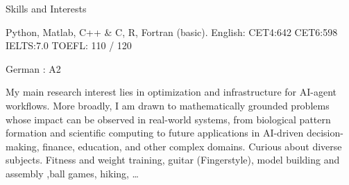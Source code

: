 
\begin{rubric}{Skills and Interests}

	Python, Matlab, C++ \& C, R, Fortran (basic).
\entry*[Languages]
	English: CET4:642 \quad CET6:598 \quad IELTS:7.0 \quad TOEFL: 110 / 120
    \par German : A2

My main research interest lies in optimization and infrastructure for AI-agent workflows. 
More broadly, I am drawn to mathematically grounded problems whose impact can be observed in real-world systems, from biological pattern formation and scientific computing to future applications in AI-driven decision-making, finance, education, and other complex domains. Curious about diverse subjects.	
	Fitness and weight training, guitar (Fingerstyle), model building and assembly ,ball games, hiking, \ldots
    
    
\end{rubric}

